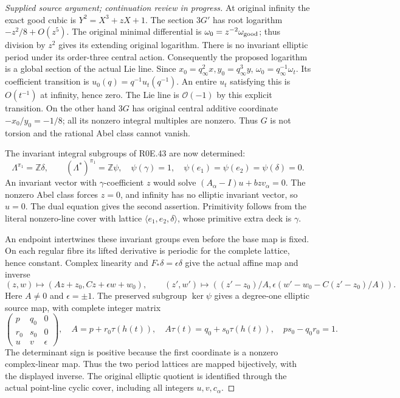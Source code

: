 \begin{proof}[Supplied source argument; continuation review in progress]
At original infinity the exact good cubic is
\(Y^2=X^3+zX+1\). The section \(3G'\) has root logarithm
\(-z^2/8+O(z^5)\). The original minimal differential is
\(\omega_0=z^{-2}\omega_{\rm good}\); thus division by \(z^2\)
gives its extending original logarithm. There is no invariant
elliptic period under its order-three central action. Consequently
the proposed logarithm is a global section of the actual Lie line.
Since \(x_0=q_\infty^2x,y_0=q_\infty^3y\),
\(\omega_0=q_\infty^{-1}\omega_t\). Its coefficient transition
is \(u_0(q)=q^{-1}u_t(q^{-1})\). An entire \(u_t\) satisfying this
is \(O(t^{-1})\) at infinity, hence zero. The Lie line is
\(\mathcal O(-1)\) by this explicit transition. On the other hand
\(3G\) has original central additive coordinate
\(-x_0/y_0=-1/8\); all its nonzero integral multiples are nonzero.
Thus \(G\) is not torsion and the rational Abel class cannot vanish.

The invariant integral subgroups of R0E.43 are now determined:
\[
 \Lambda^{\pi_1}=\mathbb Z\delta,\qquad
 (\Lambda^*)^{\pi_1}=\mathbb Z\psi,\quad
 \psi(\gamma)=1,\quad\psi(e_1)=\psi(e_2)=\psi(\delta)=0.
 \tag{R0E.45}
\]
An invariant vector with \(\gamma\)-coefficient \(z\) would solve
\((A_\alpha-I)u+bzv_\alpha=0\). The nonzero Abel class forces
\(z=0\), and infinity has no elliptic invariant vector, so \(u=0\).
The dual equation gives the second assertion. Primitivity follows
from the literal nonzero-line cover with lattice
\(\langle e_1,e_2,\delta\rangle\), whose primitive extra deck is
\(\gamma\).

An endpoint intertwines these invariant groups even before the base
map is fixed. On each regular fibre its lifted derivative is periodic
for the complete lattice, hence constant. Complex linearity and
\(F_*\delta=\epsilon\delta\) give the actual affine map and inverse
\[
 (z,w)\mapsto(Az+z_0,Cz+\epsilon w+w_0),\qquad
 (z',w')\mapsto
 ((z'-z_0)/A,\epsilon(w'-w_0-C(z'-z_0)/A)).
 \tag{R0E.46}
\]
Here \(A\ne0\) and \(\epsilon=\pm1\). The preserved subgroup
\(\ker\psi\) gives a degree-one elliptic source map, with complete
integer matrix
\[
 \begin{pmatrix}p&q_0&0\\ r_0&s_0&0\\u&v&\epsilon\end{pmatrix},
 \quad A=p+r_0\tau(h(t)),\quad
 A\tau(t)=q_0+s_0\tau(h(t)),\quad ps_0-q_0r_0=1.
 \tag{R0E.47}
\]
The determinant sign is positive because the first coordinate is a
nonzero complex-linear map. Thus the two period lattices are mapped
bijectively, with the displayed inverse. The original elliptic
quotient is identified through the actual point-line cyclic cover,
including all integers \(u,v,c_\alpha\).


\end{proof}
